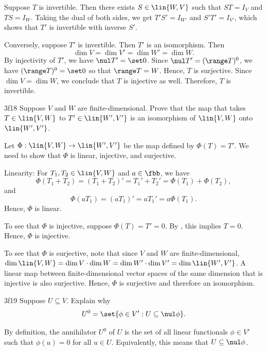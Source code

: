 \begin{sol}
    Suppose $T$ is invertible.
	Then there exists $S \in \lin{W, V}$ such that $ST = I_V$ and $TS = I_W$.
	Taking the dual of both sides, we get $T'S' = I_{W'}$ and $S'T' = I_{V'}$, which shows that $T'$ is invertible with inverse $S'$.

    Conversely, suppose $T'$ is invertible.
	Then $T'$ is an isomorphism.
	Then
    \[
    	\dim V = \dim V' = \dim W' = \dim W.
    \]
    By injectivity of $T'$, we have $\nul T' = \set 0$.
	Since $\nul T' = (\range T)^0$, we have $(\range T)^0 = \set 0$ so that $\range T = W$.
	Hence, $T$ is surjective.
	Since $\dim V = \dim W$, we conclude that $T$ is injective as well.
	Therefore, $T$ is invertible.
\end{sol}

\begin{exercise}{3f18}
    Suppose $V$ and $W$ are finite-dimensional.
	Prove that the map that takes $T \in \lin{V, W}$ to $T' \in \lin{W', V'}$ is an isomorphism of $\lin{V, W}$ onto $\lin{W', V'}$.
\end{exercise}

\begin{sol}
    Let $\Phi: \lin{V, W} \to \lin{W', V'}$ be the map defined by $\Phi(T) = T'$.
	We need to show that $\Phi$ is linear, injective, and surjective.

    Linearity: For $T_1, T_2 \in \lin{V, W}$ and $a \in \fbb$, we have
    \[
    	\Phi(T_1 + T_2) = (T_1 + T_2)' = T_1' + T_2' = \Phi(T_1) + \Phi(T_2),
    \]
    and
    \[
    	\Phi(aT_1) = (aT_1)' = aT_1' = a\Phi(T_1).
    \]
    Hence, $\Phi$ is linear.

    To see that $\Phi$ is injective, suppose $\Phi(T) = T' = 0$.
	By , this implies $T = 0$.
	Hence, $\Phi$ is injective.

    To see that $\Phi$ is surjective, note that since $V$ and $W$ are finite-dimensional, $\dim \lin{V, W} = \dim V \cdot \dim W = \dim W' \cdot \dim V' = \dim \lin{W', V'}$.
	A linear map between finite-dimensional vector spaces of the same dimension that is injective is also surjective.
	Hence, $\Phi$ is surjective and therefore an isomorphism.
\end{sol}

\begin{exercise}{3f19}
    Suppose $U \subseteq V$.
	Explain why
    \[
    	U^0 = \set{\phi \in V' : U \subseteq \nul \phi}.
    \]
\end{exercise}

\begin{sol}
    By definition, the annihilator $U^0$ of $U$ is the set of all linear functionals $\phi \in V'$ such that $\phi(u) = 0$ for all $u \in U$.
	Equivalently, this means that $U \subseteq \nul \phi$.
\end{sol}

